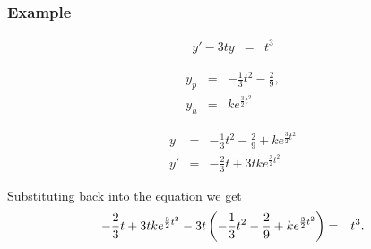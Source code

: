 \begin{frame}
  \frametitle{Example}

  \begin{eqnarray*}
    y' - 3ty & = & t^3
  \end{eqnarray*}

  \begin{eqnarray*}
    y_p & = & -\frac{1}{3} t^2 - \frac{2}{9}, \\
    y_h & = & k e^{\frac{3}{2}t^2}
  \end{eqnarray*}

  \begin{eqnarray*}
    y & = & -\frac{1}{3} t^2 - \frac{2}{9} + k e^{\frac{3}{2}t^2} \\
    y' & = & -\frac{2}{3} t + 3t k e^{\frac{3}{2}t^2}
  \end{eqnarray*}

  Substituting back into the equation we get
  \begin{eqnarray*}
    -\frac{2}{3} t + 3t k e^{\frac{3}{2}t^2} - 3t \left( -\frac{1}{3} t^2 - \frac{2}{9} + k e^{\frac{3}{2}t^2} \right) & = & t^3.
  \end{eqnarray*}

\end{frame}


